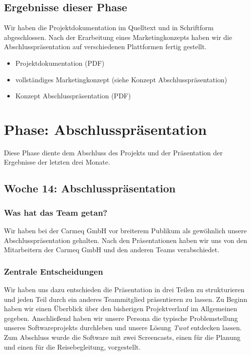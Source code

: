\documentclass{article}
\begin{document}
\subsection{Ergebnisse dieser Phase}

Wir haben die Projektdokumentation im Quelltext und in Schriftform abgeschlossen. Nach der Erarbeitung eines Marketingkonzepts haben wir die Abschlusspr\"asentation auf verschiedenen Plattformen fertig gestellt.

\begin{itemize}
\item Projektdokumentation (PDF)
\item vollst\"andiges Marketingkonzept (siehe Konzept Abschlusspr\"asentation)
\item Konzept Abschlusspr\"asentation (PDF)
\end{itemize}



\section{Phase: Abschlusspr\"asentation}

Diese Phase diente dem Abschluss des Projekts und der Pr\"asentation der Ergebnisse der letzten drei Monate.

\subsection{Woche 14: Abschlusspr\"asentation}

\subsubsection{Was hat das Team getan?}

Wir haben bei der Carmeq GmbH vor breiterem Publikum als gew\"ohnlich unsere Abschlusspr\"asentation gehalten. Nach den Pr\"asentationen haben wir uns von den Mitarbeitern der Carmeq GmbH und den anderen Teams verabschiedet.

\subsubsection{Zentrale Entscheidungen}

Wir haben uns dazu entschieden die Pr\"asentation in drei Teilen zu strukturieren und jeden Teil durch ein anderes Teammitglied pr\"asentieren zu lassen. Zu Beginn haben wir einen \"Uberblick \"uber den bisherigen Projektverlauf im Allgemeinen gegeben. Anschlie\ss end haben wir unsere Persona die typische Problemstellung unseres Softwareprojekts durchleben und unsere L\"osung \textit{Twot} entdecken lassen. Zum Abschluss wurde die Software mit zwei Screencasts, einen f\"ur die Planung und einen f\"ur die Reisebegleitung, vorgestellt.
\end{document}
